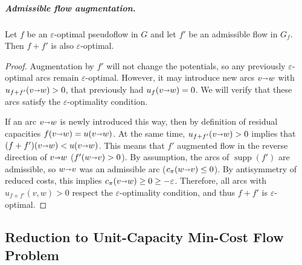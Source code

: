 \documentclass[a4paper,UKenglish]{socg-lipics-v2018}
\makeatletter
\def\eps{\varepsilon}
\def\arcto{\mathord\shortrightarrow}
\def\arc#1#2{#1\arcto#2}
\def\supp{\operatorname{supp}}
\theoremstyle{plain}
\numberwithin{figure}{section}
\renewcommand{\paragraph}{\subparagraph}
\def\n@te#1{\textsf{\boldmath \textbf{$\langle\!\langle$#1$\rangle\!\rangle$}}\leavevmode}
\def\note#1{\textcolor{red}{\n@te{#1}}}
\renewcommand{\note}[1]{} %
\makeatother
\begin{document}
\begin{toappendix}
\paragraph{Admissible flow augmentation.}

\begin{lemmarep}
\label{lemma:eps_opt_preserve}
Let $f$ be an $\eps$-optimal pseudoflow in $G$ and let $f'$ be an
admissible flow in $G_f$.
Then $f + f'$ is also $\eps$-optimal.
\end{lemmarep}

\begin{proof}
Augmentation by $f'$ will not change the potentials, so any previously
$\eps$-optimal arcs remain $\eps$-optimal.
However, it may introduce new arcs $\arc vw$ with $u_{f+f'}(\arc vw) > 0$, that previously had
$u_f(\arc vw) = 0$.
We will verify that these arcs satisfy the $\eps$-optimality condition.

If an arc $\arc vw$ is newly introduced this way, then by definition of residual
capacities $f(\arc vw) = u(\arc vw)$.
At the same time, $u_{f+f'}(\arc vw) > 0$ implies that $(f+f')(\arc vw) < u(\arc vw)$.
This means that $f'$ augmented flow in the reverse direction of $\arc vw$
($f'(\arc wv) > 0$).
By assumption, the arcs of $\supp(f')$ are admissible, so $\arc wv$ was an
admissible arc ($c_\pi(\arc wv) \leq 0$).
By antisymmetry of reduced costs, this implies $c_\pi(\arc vw) \geq 0 \geq -\eps$.
Therefore, all arcs with $u_{f+f'}(v, w) > 0$ respect the $\eps$-optimality condition,
and thus $f+f'$ is $\eps$-optimal.
\end{proof}
\end{toappendix}



\subsection{Reduction to Unit-Capacity Min-Cost Flow Problem}
\label{SS:reduction}
\end{document}
